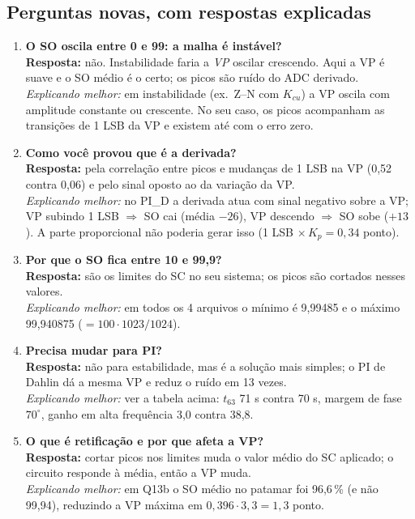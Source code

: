 \documentclass[11pt,a4paper]{article}
\begin{document}
\subsection{Perguntas novas, com respostas explicadas}
\begin{enumerate}[leftmargin=*]
\item \textbf{O SO oscila entre 0 e 99: a malha é instável?}\\
\textbf{Resposta:} não. Instabilidade faria a \emph{VP} oscilar crescendo. Aqui a VP é suave e o SO médio é o certo; os picos são ruído do ADC derivado.\\
\emph{Explicando melhor:} em instabilidade (ex.\ Z--N com $K_{cu}$) a VP oscila com amplitude constante ou crescente. No seu caso, os picos acompanham as transições de 1 LSB da VP e existem até com o erro zero.
\item \textbf{Como você provou que é a derivada?}\\
\textbf{Resposta:} pela correlação entre picos e mudanças de 1 LSB na VP (0,52 contra 0,06) e pelo sinal oposto ao da variação da VP.\\
\emph{Explicando melhor:} no PI\_D a derivada atua com sinal negativo sobre a VP; VP subindo 1 LSB $\Rightarrow$ SO cai (média $-26$), VP descendo $\Rightarrow$ SO sobe ($+13$). A parte proporcional não poderia gerar isso (1 LSB $\times\,K_p=0{,}34$ ponto).
\item \textbf{Por que o SO fica entre 10 e 99,9?}\\
\textbf{Resposta:} são os limites do SC no seu sistema; os picos são cortados nesses valores.\\
\emph{Explicando melhor:} em todos os 4 arquivos o mínimo é 9,99485 e o máximo 99,940875 ($=100\cdot1023/1024$).
\item \textbf{Precisa mudar para PI?}\\
\textbf{Resposta:} não para estabilidade, mas é a solução mais simples; o PI de Dahlin dá a mesma VP e reduz o ruído em 13 vezes.\\
\emph{Explicando melhor:} ver a tabela acima: $t_{63}$ 71 s contra 70 s, margem de fase $70^\circ$, ganho em alta frequência 3,0 contra 38,8.
\item \textbf{O que é retificação e por que afeta a VP?}\\
\textbf{Resposta:} cortar picos nos limites muda o valor médio do SC aplicado; o circuito responde à média, então a VP muda.\\
\emph{Explicando melhor:} em Q13b o SO médio no patamar foi 96,6\,\% (e não 99,94), reduzindo a VP máxima em $0{,}396\cdot3{,}3=1{,}3$ ponto.

\end{enumerate}
\end{document}
